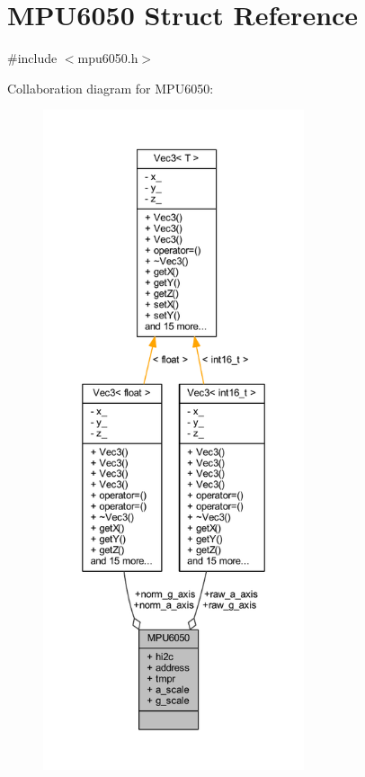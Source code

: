 \hypertarget{struct_m_p_u6050}{}\section{M\+P\+U6050 Struct Reference}
\label{struct_m_p_u6050}


{\ttfamily \#include $<$mpu6050.\+h$>$}



Collaboration diagram for M\+P\+U6050\+:
\nopagebreak
\begin{figure}[H]
\begin{center}
\leavevmode
\includegraphics[height=550pt]{struct_m_p_u6050__coll__graph}
\end{center}
\end{figure}
